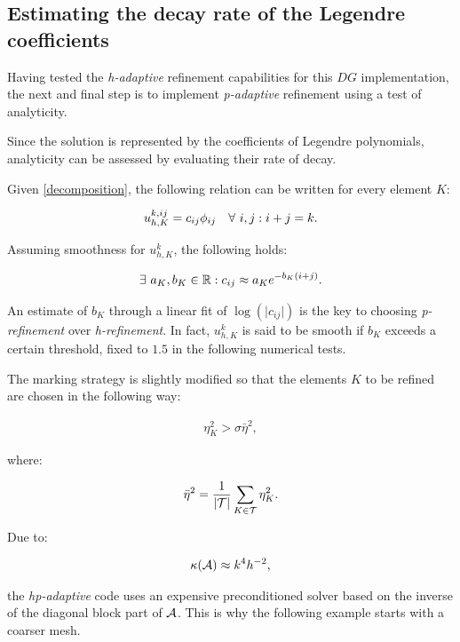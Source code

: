 \subsection{Estimating the decay rate of the Legendre coefficients}

Having tested the \textit{h-adaptive} refinement capabilities for this $DG$ implementation, the next and final step is to implement \textit{p-adaptive} refinement using a test of analyticity.

\cite{Eibner2007} Since the solution is represented by the coefficients of Legendre polynomials, analyticity can be assessed by evaluating their rate of decay.

Given \eqref{decomposition}, the following relation can be written for every element $K$:

\begin{gather}
    u^{k, ij}_{h, K} = c_{ij} \phi_{ij} \quad \forall ~ i, j : i + j = k.
\end{gather}

Assuming smoothness for $u^k_{h, K}$, the following holds:

\begin{gather}
    \exists ~ a_K, b_K \in \mathbb{R} : c_{ij} \approx a_K e^{-b_K (i + j)}.
\end{gather}

An estimate of $b_K$ through a linear fit of $\log(\lvert c_{ij} \rvert)$ is the key to choosing \textit{p-refinement} over \textit{h-refinement}. In fact, $u^k_{h, K}$ is said to be smooth if $b_K$ exceeds a certain threshold, fixed to $1.5$ in the following numerical tests.

The marking strategy is slightly modified so that the elements $K$ to be refined are chosen in the following way:

\begin{gather}
    \eta_K^2 > \sigma \bar{\eta}^2,
\end{gather}

where:

\begin{gather}
    \bar{\eta}^2 = \frac{1}{\lvert \mathcal{T} \rvert} \sum_{K \in \mathcal{T}} \eta_K^2.
\end{gather}

Due to:

\begin{gather}
    \kappa(\mathcal{A}) \approx k^4 h^{-2},
\end{gather}

the \textit{hp-adaptive} code uses an expensive preconditioned solver based on the inverse of the diagonal block part of $\mathcal{A}$. This is why the following example starts with a coarser mesh.

